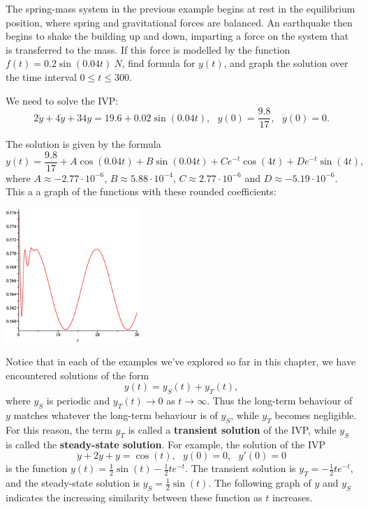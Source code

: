 \documentclass[12pt,letterpaper,twoside]{amsart}
\newcounter{example}
\newcommand{\example}{\bigskip \noindent {\large {\sc Example \arabic{example}:}} \addtocounter{example}{1}}
\begin{document}
\example The spring-mass system in the previous example begins at rest in the equilibrium position, where spring and gravitational forces are balanced.  An earthquake then begins to shake the building up and down, imparting a force on the system that is transferred to the mass.  If this force is modelled by the function $f(t)=0.2 \sin(0.04t) \ N$, find formula for $y(t)$, and graph the solution over the time interval $0 \leq t \leq 300$.

We need to solve the IVP:
\[ 2 \ddot{y} + 4\dot{y} + 34 y = 19.6 + 0.02 \sin(0.04 t), \ \ \ y(0)=\frac{9.8}{17}, \ \ \ \dot{y}(0)=0.\]

The solution is given by the formula
\[ y(t) = \frac{9.8}{17}+A \cos(0.04t)+B\sin(0.04t)+Ce^{-t}\cos(4t)+De^{-t}\sin(4t),\]
where $A \approx -2.77 \cdot 10^{-6}$, $B \approx 5.88\cdot 10^{-4}$, $C\approx 2.77 \cdot 10^{-6}$ and  $D \approx -5.19 \cdot 10^{-6}$.  This a a graph of the functions with these rounded coefficients:

\begin{center}
\includegraphics[width=2in]{sinusoidaldriving.eps}
\end{center}

Notice that in each of the examples we've explored so far in this chapter, we have encountered solutions of the form
\[ y(t) = y_S(t) + y_T(t),\]
where $y_S$ is periodic and $y_T(t) \rightarrow 0$ as $t \rightarrow \infty$.  Thus the long-term behaviour of $y$ matches whatever the long-term behaviour is of $y_S$, while $y_T$ becomes negligible.  For this reason, the term $y_T$ is called a {\bf transient solution} of the IVP, while $y_S$ is called the {\bf steady-state solution}.  For example, the solution of the IVP
\[ \ddot{y} + 2 \dot{y} + y = \cos(t), \ \ \ y(0)=0, \ \ \ y'(0)=0\]
is the function $y(t)=\frac{1}{2}\sin(t)-\frac{1}{2}te^{-t}.$
The transient solution is $y_T=-\frac{1}{2}te^{-t}$, and the steady-state solution is $y_S=\frac{1}{2}\sin(t)$.  The following graph of $y$ and $y_S$ indicates the increasing similarity between these function as $t$ increases.
\end{document}
